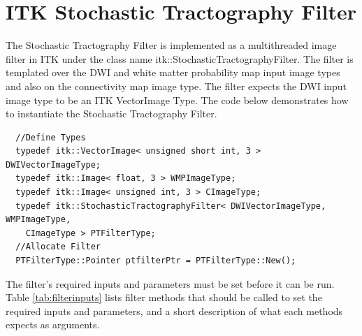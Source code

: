 \section{ITK Stochastic Tractography Filter}
The Stochastic Tractography Filter is implemented as a multithreaded image filter in ITK under the class name itk::StochasticTractographyFilter.  The filter is templated over the DWI and white matter probability map input image types and also on the connectivity map image type.  The filter expects the DWI input image type to be an ITK VectorImage Type.  The code below demonstrates how to instantiate the Stochastic Tractography Filter.
\begin{verbatim}
  //Define Types
  typedef itk::VectorImage< unsigned short int, 3 > DWIVectorImageType;
  typedef itk::Image< float, 3 > WMPImageType;
  typedef itk::Image< unsigned int, 3 > CImageType;
  typedef itk::StochasticTractographyFilter< DWIVectorImageType, WMPImageType,
    CImageType > PTFilterType;
  //Allocate Filter
  PTFilterType::Pointer ptfilterPtr = PTFilterType::New();
\end{verbatim}

The filter's required inputs and parameters must be set before it can be run.  Table \ref{tab:filterinputs} lists filter methods that should be called to set the required inputs and parameters,  and a short description of what each methods expects as arguments.

